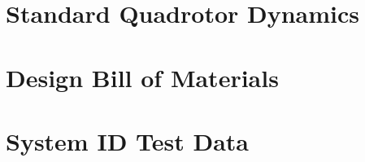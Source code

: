 \appendix
\chapter{Standard Quadrotor Dynamics}
\label{app:stddynamics}

\chapter{Design Bill of Materials}
\label{app:bom}
\chapter{System ID Test Data}
\label{app:bom}